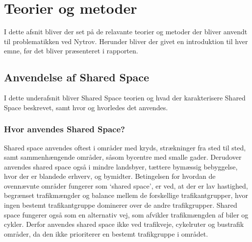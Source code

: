 \chapter{Teorier og metoder}
\label{chap:teorier_og_metoder}
I dette afsnit bliver der set på de relavante teorier og metoder der bliver anvendt til problematikken ved Nytrov. Herunder bliver der givet en introduktion til hver emne, før det bliver præsenteret i rapporten.

\section{Anvendelse af Shared Space}
\label{sec:shared_space}
I dette underafsnit bliver Shared Space teorien og hvad der karakterisere Shared Space beskrevet, samt hvor og hvorledes det anvendes.
\subsection{Hvor anvendes Shared Space?}
\label{sub:hvor_anvendes_share_space}
Shared space anvendes oftest i områder med kryds, strækninger fra sted til sted, samt sammenhængende områder, såsom bycentre med smalle gader. Derudover anvendes shared space også i mindre landsbyer, tættere bymæssig bebyggelse, hvor der er blandede erhverv, og bymidter. Betingelsen for hvordan de ovennævnte områder fungerer som ‘shared space’, er ved, at der er lav hastighed, begrænset trafikmængder og balance mellem de forskellige trafikantgrupper, hvor ingen bestemt trafikantgruppe dominerer over de andre trafikgrupper. Shared space fungerer også som en alternativ vej, som afvikler trafikmængden af biler og cykler. Derfor anvendes shared space ikke ved trafikveje, cykelruter og bustrafik områder, da den ikke prioriterer en bestemt trafikgruppe i området. %
